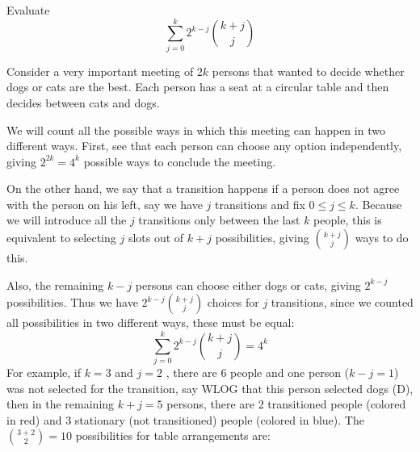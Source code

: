 \begin{problem}[C][7][Putnam 2020 /A2]
    Evaluate
    $$\sum_{j=0}^k 2^{k-j} \binom{k+j}{j}$$
\end{problem}

\begin{solution}[$4^k$]
    Consider a very important meeting of $2k$ persons that wanted to decide whether dogs or cats are the best. Each person has a seat at a circular table and then decides between cats and dogs.
    
    We will count all the possible ways in which this meeting can happen in two different ways. First, see that each person can choose any option independently, giving $2^{2k}=4^k$ possible ways to conclude the meeting.

    On the other hand, we say that a transition happens if a person does not agree with the person on his left, say we have $j$ transitions and fix $0\leq j \leq k$. Because we will introduce all the $j$ transitions only between the last $k$ people, this is equivalent to selecting $j$ slots out of $k+j$ possibilities, giving $\binom{k+j}{j}$ ways to do this. 
    
    Also, the remaining $k-j$ persons can choose either dogs or cats, giving $2^{k-j}$ possibilities. Thus we have $2^{k-j}\binom{k+j}{j}$ choices for $j$ transitions, since we counted all possibilities in two different ways, these must be equal: 
    $$\sum_{j=0}^k 2^{k-j} \binom{k+j}{j}=4^k $$
    For example, if $k=3$ and $j=2$ , there are 6 people and one person ($k-j=1$) was not selected for the transition, say WLOG that this person selected dogs (D), then in the remaining $k+j=5$ persons, there are 2 transitioned people (colored in red) and 3 stationary (not transitioned) people (colored in blue). The $\binom{3+2}{2}=10$ possibilities for table arrangements are:
    
\end{solution}
